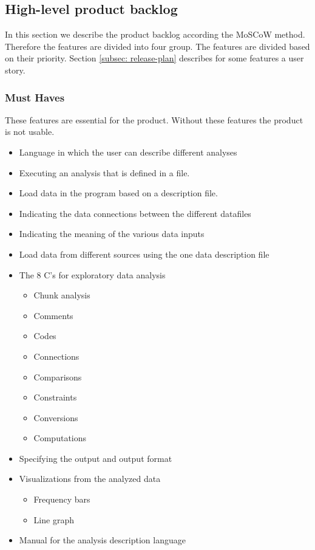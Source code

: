 \subsection{High-level product backlog}
\label{subsec: MoSCoW}
In this section we describe the product backlog according the MoSCoW method. Therefore the features are divided into four group. The features are divided based on their priority. Section \ref{subsec: release-plan} describes for some features a user story.
\subsubsection{Must Haves}
These features are essential for the product. Without these features the product is not usable.
\begin{itemize}
  \item Language in which the user can describe different analyses
  \item Executing an analysis that is defined in a file.
  \item Load data in the program based on a description file.
  \item Indicating the data connections between the different datafiles
  \item Indicating the meaning of the various data inputs
  \item Load data from different sources using the one data description file
  \item The 8 C's for exploratory data analysis
  \begin{itemize}
    \item Chunk analysis
    \item Comments
    \item Codes 
    \item Connections
    \item Comparisons
    \item Constraints
    \item Conversions
    \item Computations
  \end{itemize}
  \item Specifying the output and output format
  \item Visualizations from the analyzed data
  \begin{itemize}
  	\item Frequency bars
    \item Line graph
  \end{itemize}
  \item Manual for the analysis description language
\end{itemize}

